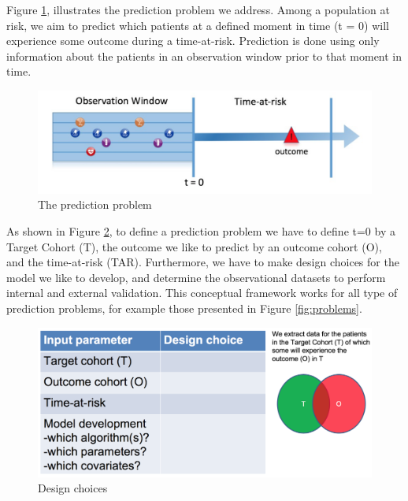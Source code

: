 \documentclass[]{book}
\begin{document}
Figure \ref{fig:figure1}, illustrates the prediction problem we address.
Among a population at risk, we aim to predict which patients at a
defined moment in time (t = 0) will experience some outcome during a
time-at-risk. Prediction is done using only information about the
patients in an observation window prior to that moment in time.

\begin{figure}
\includegraphics[width=1\linewidth]{images/PatientLevelPrediction/Figure1} \caption{The prediction problem}\label{fig:figure1}
\end{figure}

As shown in Figure \ref{fig:studydesign}, to define a prediction problem
we have to define t=0 by a Target Cohort (T), the outcome we like to
predict by an outcome cohort (O), and the time-at-risk (TAR).
Furthermore, we have to make design choices for the model we like to
develop, and determine the observational datasets to perform internal
and external validation. This conceptual framework works for all type of
prediction problems, for example those presented in Figure
\ref{fig:problems}.

\begin{figure}
\includegraphics[width=1\linewidth]{images/PatientLevelPrediction/studydesign} \caption{Design choices}\label{fig:studydesign}
\end{figure}
\end{document}
